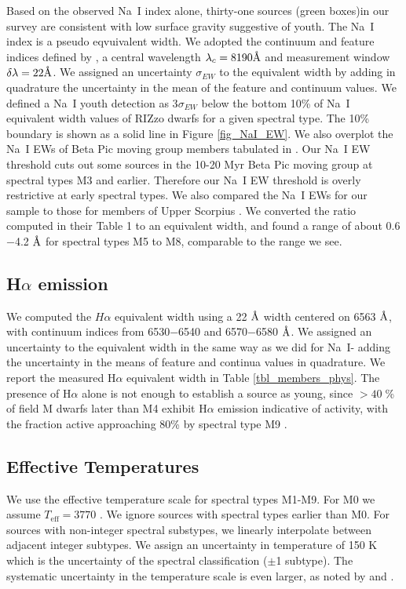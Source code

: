 Based on the observed Na~I index alone, thirty-one sources (green boxes)in our survey are consistent with low surface gravity suggestive of youth.  The Na~I index is a pseudo eqvuivalent width.  We adopted the continuum and feature indices defined by \citet{2012AJ....143..114S}, a central wavelength $\lambda_c= 8190 \mbox{\normalfont\AA}$ and measurement window $\delta \lambda = 22 \mbox{\normalfont\AA}$.  We assigned an uncertainty $\sigma_{EW}$ to the equivalent width by adding in quadrature the uncertainty in the mean of the feature and continuum values.  We defined a Na~I youth detection as 3$\sigma_{EW}$ below the bottom 10\% of Na~I equivalent width values of RIZzo dwarfs for a given spectral type.  The 10\% boundary is shown as a solid line in Figure \ref{fig_NaI_EW}.  We also overplot the Na~I EWs of Beta Pic moving group members tabulated in \citet{2012AJ....143..114S}.  Our Na~I EW threshold cuts out some sources in the 10-20 Myr Beta Pic moving group \citep{2012AJ....143..114S} at spectral types M3 and earlier.  Therefore our Na~I EW threshold is overly restrictive at early spectral types.  We also compared the Na~I EWs for our sample to those for members of Upper Scorpius \citep{2006AJ....131.3016S}.  We converted the ratio computed in their Table 1 to an equivalent width, and found a range of about 0.6$-$4.2 $\mbox{\normalfont\AA}$ for spectral types M5 to M8, comparable to the range we see. 


\subsection{H$\alpha$ emission}
We computed the $H\alpha$ equivalent width using a 22 $\mbox{\normalfont\AA}$ width centered on 6563 $\mbox{\normalfont\AA}$, with continuum indices from 6530$-$6540 and 6570$-$6580 $\mbox{\normalfont\AA}$.  We assigned an uncertainty to the equivalent width in the same way as we did for Na~I- adding the uncertainty in the means of feature and continua values in quadrature.  We report the measured H$\alpha$ equivalent width in Table \ref{tbl_members_phys}.  The presence of H$\alpha$ alone is not enough to establish a source as young, since $>40\;$\% of field M dwarfs later than M4 exhibit H$\alpha$ emission indicative of activity, with the fraction active approaching 80\% by spectral type M9 \citep{2011AJ....141...97W}.  


\subsection{Effective Temperatures}
We use the \cite{2003ApJ...593.1093L} effective temperature scale for spectral types M1-M9.  For M0 we assume $T_{\mathrm{eff}}= 3770$ \citep{2013ApJS..208....9P}.  We ignore sources with spectral types earlier than M0.  For sources with non-integer spectral substypes, we linearly interpolate between adjacent integer subtypes.  We assign an uncertainty in temperature of 150 K which is the uncertainty of the spectral classification ($\pm$1 subtype).  The systematic uncertainty in the temperature scale is even larger, as noted by \citet{2013ApJS..208....9P} and \citet{2010ApJS..186...63R}.

